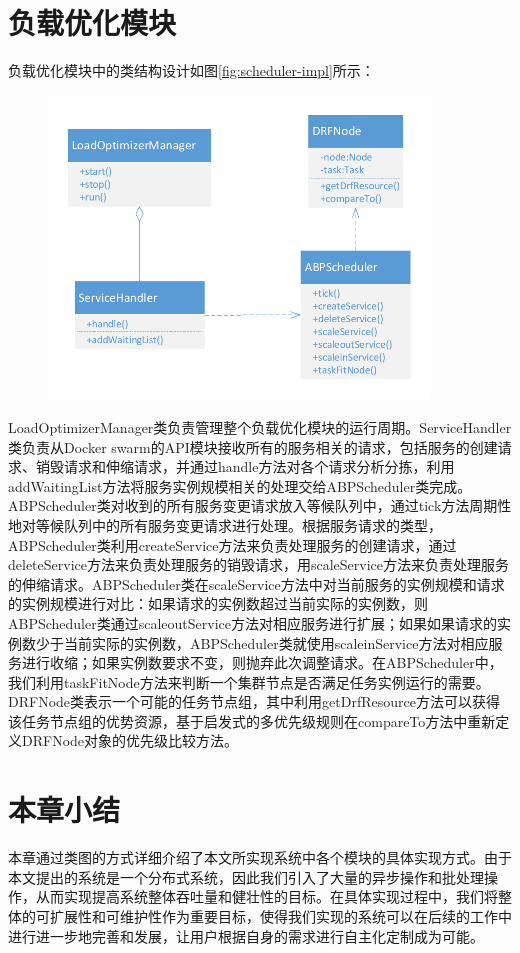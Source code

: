 \section{负载优化模块}
负载优化模块中的类结构设计如图\ref{fig:scheduler-impl}所示：
\begin{figure}[H]
\centering
\includegraphics[width=0.9\textwidth]{./figure/scheduler_impl}
\end{figure}
LoadOptimizerManager类负责管理整个负载优化模块的运行周期。ServiceHandler类负责从Docker swarm的API模块接收所有的服务相关的请求，包括服务的创建请求、销毁请求和伸缩请求，并通过handle方法对各个请求分析分拣，利用addWaitingList方法将服务实例规模相关的处理交给ABPScheduler类完成。ABPScheduler类对收到的所有服务变更请求放入等候队列中，通过tick方法周期性地对等候队列中的所有服务变更请求进行处理。根据服务请求的类型，ABPScheduler类利用createService方法来负责处理服务的创建请求，通过deleteService方法来负责处理服务的销毁请求，用scaleService方法来负责处理服务的伸缩请求。ABPScheduler类在scaleService方法中对当前服务的实例规模和请求的实例规模进行对比：如果请求的实例数超过当前实际的实例数，则ABPScheduler类通过scaleoutService方法对相应服务进行扩展；如果如果请求的实例数少于当前实际的实例数，ABPScheduler类就使用scaleinService方法对相应服务进行收缩；如果实例数要求不变，则抛弃此次调整请求。在ABPScheduler中，我们利用taskFitNode方法来判断一个集群节点是否满足任务实例运行的需要。DRFNode类表示一个可能的任务节点组，其中利用getDrfResource方法可以获得该任务节点组的优势资源，基于启发式的多优先级规则在compareTo方法中重新定义DRFNode对象的优先级比较方法。

\section{本章小结}
本章通过类图的方式详细介绍了本文所实现系统中各个模块的具体实现方式。由于本文提出的系统是一个分布式系统，因此我们引入了大量的异步操作和批处理操作，从而实现提高系统整体吞吐量和健壮性的目标。在具体实现过程中，我们将整体的可扩展性和可维护性作为重要目标，使得我们实现的系统可以在后续的工作中进行进一步地完善和发展，让用户根据自身的需求进行自主化定制成为可能。